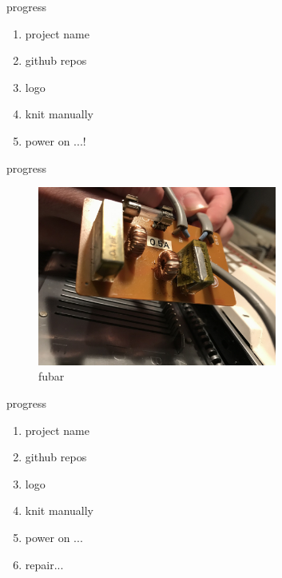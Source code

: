 \documentclass{beamer}
\begin{document}
\begin{frame}{progress}
    \begin{enumerate}
        \item project name \pause \emojiCheck \pause
        \item github repos \pause \emojiCheck \pause
        \item logo \pause \emojiCheck \pause
        \item knit manually \pause \emojiCheck \pause
        \item power on ...! \pause
    \end{enumerate}

    \center
     \pause %
     \pause %
     \pause %
     \pause %
\end{frame}

\begin{frame}{progress}
    \begin{figure}
        \includegraphics[width=0.7\textwidth]{./images/exploded-capacitor.png}
        \caption{fubar}
    \end{figure}
\end{frame}

\begin{frame}{progress}
    \begin{enumerate}
        \item project name \emojiCheck
        \item github repos \emojiCheck
        \item logo \emojiCheck
        \item knit manually \emojiCheck
        \item power on ... \emojiFail \pause
        \item repair...
    \end{enumerate}
\end{frame}
\end{document}
